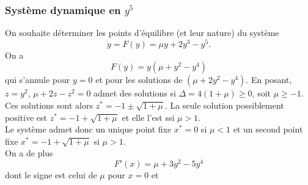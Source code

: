 \subsubsection{Système dynamique en $y^5$ \todo{}}

On souhaite déterminer les points d'équilibre (et leur nature) du système
$$
\dot y = F(y) = \mu y + 2 y^3 - y^5.
$$
On a 
$$
F(y) = y(\mu + y^2 - y^4)
$$
qui s'annule pour $y = 0$ et pour les solutions de $(\mu + 2 y^2 - y^4)$. En posant, $z = y^2$, $\mu + 2 z - z^2 = 0$ admet des solutions si $\Delta =  4(1 + \mu) \geq 0$, soit $\mu \geq -1$. Ces solutions sont alors $z^* = -1 \pm \sqrt{1+\mu}$. La seule solution possiblement positive est $z^* = -1 + \sqrt{1+\mu}$ et elle l'est ssi $\mu > 1$. \\
Le système admet donc un unique point fixe $x^*=0$ si $\mu < 1$ et un second point fixe $x^* = -1+\sqrt{1+\mu}$ si $\mu > 1$. \\
On a de plus
$$
F'(x) = \mu + 3 y^2 - 5y^4
$$
dont le signe est celui de $\mu$ pour $x=0$ et 
